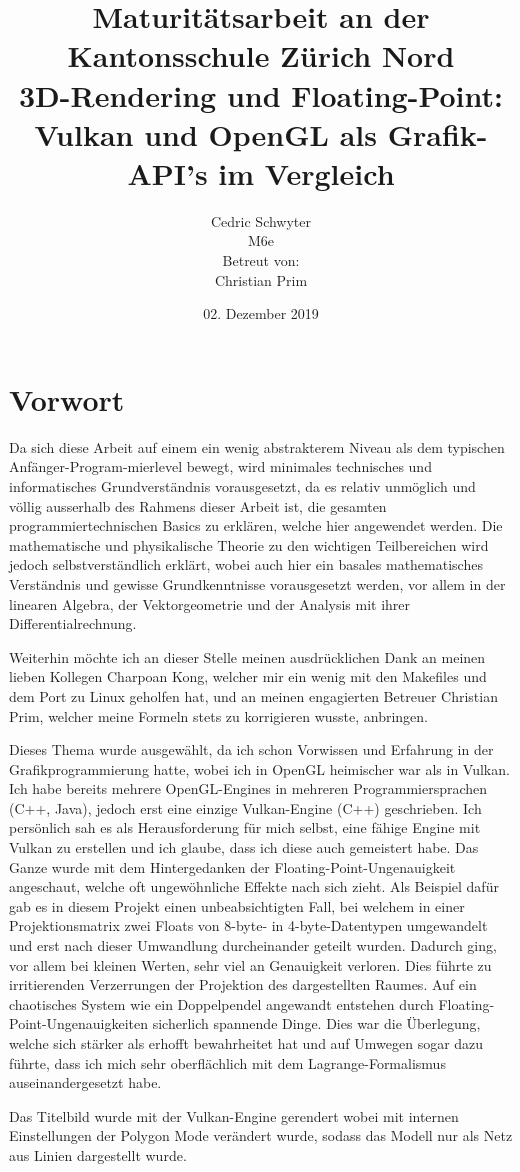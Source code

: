 \documentclass[titlepage, 11pt, a4paper, ngerman]{article}
\title{\large Maturitätsarbeit an der Kantonsschule Zürich Nord \\ \huge 3D-Rendering und Floating-Point: Vulkan und OpenGL als Grafik-API's im Vergleich}
\date{02. Dezember 2019}
\author{Cedric Schwyter \\ M6e \\ Betreut von: \\ Christian Prim}
\begin{document}
\maketitle
{}


\newpage
{}
\tableofcontents

\newpage
{}
\section{Vorwort}
Da sich diese Arbeit auf einem ein wenig abstrakterem Niveau als dem typischen Anfänger-Program-mierlevel bewegt, wird minimales technisches und informatisches Grundverständnis vorausgesetzt, da es relativ unmöglich und völlig ausserhalb des Rahmens dieser Arbeit ist, die gesamten programmiertechnischen Basics zu erklären, welche hier angewendet werden. Die mathematische und physikalische Theorie zu den wichtigen Teilbereichen wird jedoch selbstverständlich erklärt, wobei auch hier ein basales mathematisches Verständnis und gewisse Grundkenntnisse vorausgesetzt werden, vor allem in der linearen Algebra, der Vektorgeometrie und der Analysis mit ihrer Differentialrechnung. \par
Weiterhin möchte ich an dieser Stelle meinen ausdrücklichen Dank an meinen lieben Kollegen Charpoan Kong, welcher mir ein wenig mit den \glspl{Makefile} und dem Port zu \gls{Linux} geholfen hat, und an meinen engagierten Betreuer Christian Prim, welcher meine Formeln stets zu korrigieren wusste, anbringen.\par
Dieses Thema wurde ausgewählt, da ich schon Vorwissen und Erfahrung in der Grafikprogrammierung hatte, wobei ich in \acrshort{OpenGL} heimischer war als in Vulkan. Ich habe bereits mehrere OpenGL-\glspl{Engine} in mehreren Programmiersprachen (C++, Java), jedoch erst eine einzige Vulkan-\gls{Engine} (C++) geschrieben. Ich persönlich sah es als Herausforderung für mich selbst, eine fähige \gls{Engine} mit Vulkan zu erstellen und ich glaube, dass ich diese auch gemeistert habe. Das Ganze wurde mit dem Hintergedanken der \gls{Floating-Point}-Ungenauigkeit angeschaut, welche oft ungewöhnliche Effekte nach sich zieht. Als Beispiel dafür gab es in diesem Projekt einen unbeabsichtigten Fall, bei welchem in einer Projektionsmatrix zwei \glspl{Float} von 8-byte- in 4-byte-Datentypen umgewandelt und erst nach dieser Umwandlung durcheinander geteilt wurden. Dadurch ging, vor allem bei kleinen Werten, sehr viel an Genauigkeit verloren. Dies führte zu irritierenden Verzerrungen der Projektion des dargestellten Raumes. Auf ein chaotisches System wie ein Doppelpendel angewandt entstehen durch \gls{Floating-Point}-Ungenauigkeiten sicherlich spannende Dinge. Dies war die Überlegung, welche sich stärker als erhofft bewahrheitet hat und auf Umwegen sogar dazu führte, dass ich mich sehr oberflächlich mit dem Lagrange-Formalismus auseinandergesetzt habe.\par
Das Titelbild wurde mit der Vulkan-Engine gerendert wobei mit internen Einstellungen der Polygon Mode verändert wurde, sodass das Modell nur als Netz aus Linien dargestellt wurde.
\end{document}
